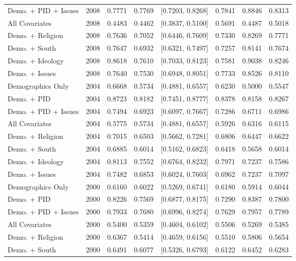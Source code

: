 \begin{longtable}{lrrrlrrr}
  Demo. + PID + Issues & 2008 & 0.7771 & 0.7769 & [0.7203, 0.8268] & 0.7841 & 0.8846 & 0.8313 \\ 
  All Covariates & 2008 & 0.4483 & 0.4462 & [0.3837, 0.5100] & 0.5691 & 0.4487 & 0.5018 \\ 
  Demo. + Religion & 2008 & 0.7636 & 0.7052 & [0.6446, 0.7609] & 0.7330 & 0.8269 & 0.7771 \\ 
  Demo. + South & 2008 & 0.7647 & 0.6932 & [0.6321, 0.7497] & 0.7257 & 0.8141 & 0.7674 \\ 
  Demo. + Ideology & 2008 & 0.8618 & 0.7610 & [0.7033, 0.8123] & 0.7581 & 0.9038 & 0.8246 \\ 
  Demo. + Issues & 2008 & 0.7640 & 0.7530 & [0.6948, 0.8051] & 0.7733 & 0.8526 & 0.8110 \\ 
  Demographics Only & 2004 & 0.6668 & 0.5734 & [0.4881, 0.6557] & 0.6230 & 0.5000 & 0.5547 \\ 
  Demo. + PID & 2004 & 0.8723 & 0.8182 & [0.7451, 0.8777] & 0.8378 & 0.8158 & 0.8267 \\ 
  Demo. + PID + Issues & 2004 & 0.7494 & 0.6923 & [0.6097, 0.7667] & 0.7286 & 0.6711 & 0.6986 \\ 
  All Covariates & 2004 & 0.5775 & 0.5734 & [0.4881, 0.6557] & 0.5926 & 0.6316 & 0.6115 \\ 
  Demo. + Religion & 2004 & 0.7015 & 0.6503 & [0.5662, 0.7281] & 0.6806 & 0.6447 & 0.6622 \\ 
  Demo. + South & 2004 & 0.6885 & 0.6014 & [0.5162, 0.6823] & 0.6418 & 0.5658 & 0.6014 \\ 
  Demo. + Ideology & 2004 & 0.8113 & 0.7552 & [0.6764, 0.8232] & 0.7971 & 0.7237 & 0.7586 \\ 
  Demo. + Issues & 2004 & 0.7482 & 0.6853 & [0.6024, 0.7603] & 0.6962 & 0.7237 & 0.7097 \\ 
  Demographics Only & 2000 & 0.6160 & 0.6022 & [0.5269, 0.6741] & 0.6180 & 0.5914 & 0.6044 \\ 
  Demo. + PID & 2000 & 0.8226 & 0.7569 & [0.6877, 0.8175] & 0.7290 & 0.8387 & 0.7800 \\ 
  Demo. + PID + Issues & 2000 & 0.7933 & 0.7680 & [0.6996, 0.8274] & 0.7629 & 0.7957 & 0.7789 \\ 
  All Covariates & 2000 & 0.5400 & 0.5359 & [0.4604, 0.6102] & 0.5506 & 0.5269 & 0.5385 \\ 
  Demo. + Religion & 2000 & 0.6367 & 0.5414 & [0.4659, 0.6156] & 0.5510 & 0.5806 & 0.5654 \\ 
  Demo. + South & 2000 & 0.6491 & 0.6077 & [0.5326, 0.6793] & 0.6122 & 0.6452 & 0.6283 \\ 

\end{longtable}

